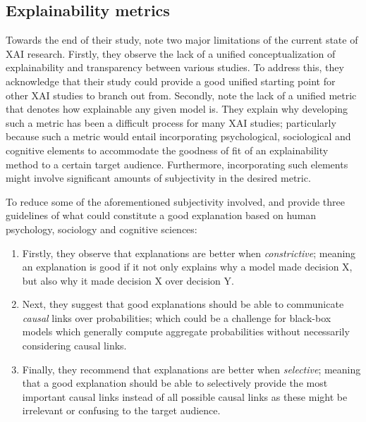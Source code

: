 \subsection{Explainability metrics}

\label{section:xai_metrics}

Towards the end of their study, \citet{arrieta2020explainable} note two major
limitations of the current state of XAI research. Firstly, they observe the lack
of a unified conceptualization of explainability and transparency between
various studies. To address this, they acknowledge that their study could
provide a good unified starting point for other XAI studies to branch out from.
Secondly, \citet{arrieta2020explainable} note the lack of a unified metric that
denotes how explainable any given model is. They explain why developing
such a metric has been a difficult process for many XAI studies; particularly
because such a metric would entail incorporating psychological, sociological and
cognitive elements to accommodate the goodness of fit of an explainability
method to a certain target audience. Furthermore, incorporating such elements
might involve significant amounts of subjectivity in the desired metric.

To reduce some of the aforementioned subjectivity involved, \citet{MILLER20191}
and \citet{arrieta2020explainable} provide three guidelines of what could
constitute a good explanation based on human psychology, sociology and cognitive
sciences:

\begin{enumerate}
  \item Firstly, they observe that explanations are better when
  \textit{constrictive}; meaning an explanation is good if it not only explains
  why a model made decision X, but also why it made decision X over decision Y.

  \item Next, they suggest that good explanations should be able to communicate
  \textit{causal} links over probabilities; which could be a challenge for black-box
  models which generally compute aggregate probabilities without necessarily
  considering causal links.

  \item Finally, they recommend that explanations are better when
  \textit{selective}; meaning that a good explanation should be able to
  selectively provide the most important causal links instead of all possible
  causal links as these might be irrelevant or confusing to the target audience.
\end{enumerate}


